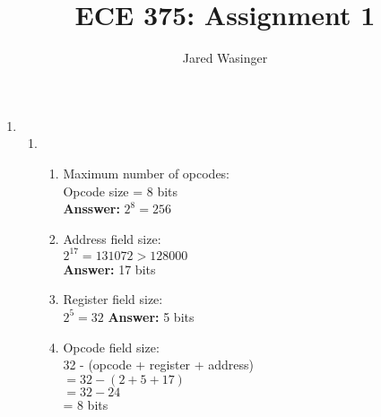 \documentclass{article}
\begin{document}
  \title{ECE 375: Assignment 1}
  \author{Jared Wasinger}

  \maketitle

  \begin{enumerate}
    \item\begin{enumerate}
      \item\begin{enumerate}
        \item Maximum number of opcodes:\\
        Opcode size = 8 bits\\
        \textbf{Ansswer:} $2^8 = 256$\\

        \item Address field size:\\
          $2^{17} = 131072 > 128000$\\
          \textbf{Answer:} 17 bits\\
        \item Register field size:\\
          $2^5=32$
          \textbf{Answer:} 5 bits\\
        \item Opcode field size:\\
          32 - (opcode + register + address)\\
          $= 32 - (2 + 5 + 17)$\\ 
          $= 32 - 24$\\
          = 8 bits
        \end{enumerate}


\end{enumerate}
\end{enumerate}
\end{document}
